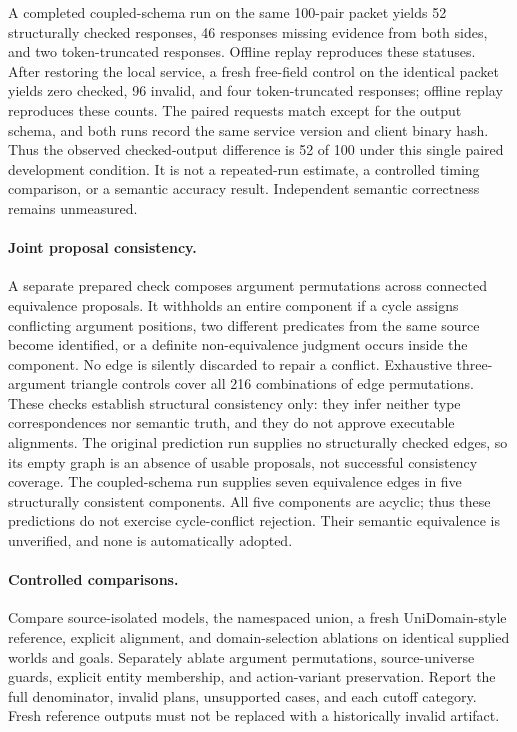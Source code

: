 \documentclass[letterpaper]{article}
\begin{document}
A completed coupled-schema run on the same 100-pair packet yields 52 structurally checked responses, 46 responses missing evidence from both sides, and two token-truncated responses. Offline replay reproduces these statuses. After restoring the local service, a fresh free-field control on the identical packet yields zero checked, 96 invalid, and four token-truncated responses; offline replay reproduces these counts. The paired requests match except for the output schema, and both runs record the same service version and client binary hash. Thus the observed checked-output difference is 52 of 100 under this single paired development condition. It is not a repeated-run estimate, a controlled timing comparison, or a semantic accuracy result. Independent semantic correctness remains unmeasured.

\paragraph{Joint proposal consistency.}
A separate prepared check composes argument permutations across connected equivalence proposals. It withholds an entire component if a cycle assigns conflicting argument positions, two different predicates from the same source become identified, or a definite non-equivalence judgment occurs inside the component. No edge is silently discarded to repair a conflict. Exhaustive three-argument triangle controls cover all 216 combinations of edge permutations. These checks establish structural consistency only: they infer neither type correspondences nor semantic truth, and they do not approve executable alignments. The original prediction run supplies no structurally checked edges, so its empty graph is an absence of usable proposals, not successful consistency coverage. The coupled-schema run supplies seven equivalence edges in five structurally consistent components. All five components are acyclic; thus these predictions do not exercise cycle-conflict rejection. Their semantic equivalence is unverified, and none is automatically adopted.

\paragraph{Controlled comparisons.}
Compare source-isolated models, the namespaced union, a fresh UniDomain-style reference, explicit alignment, and domain-selection ablations on identical supplied worlds and goals. Separately ablate argument permutations, source-universe guards, explicit entity membership, and action-variant preservation. Report the full denominator, invalid plans, unsupported cases, and each cutoff category. Fresh reference outputs must not be replaced with a historically invalid artifact.
\end{document}
